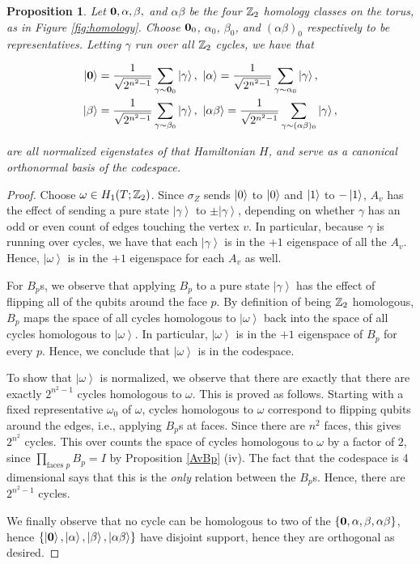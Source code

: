 \documentclass{article}
\newtheorem{proposition}{Proposition}[section]
\theoremstyle{definition}
\numberwithin{figure}{section}
\begin{document}
\begin{proposition}\label{basis} Let $\bold{0},\alpha,\beta,$ and $\alpha\beta$ be the four $\mathbb{Z}_2$ homology classes on the torus, as in Figure \ref{fig:homology}. Choose $\bold{0}_0$, $\alpha_0$, $\beta_0$, and $(\alpha\beta)_0$ respectively to be representatives. Letting $\gamma$ run over all $\mathbb{Z}_2$ cycles, we have that

\begin{align*}
\left|\bold{0}\right> &= \frac{1}{\sqrt{2^{n^2-1}}}\sum_{\gamma\sim \bold{0}_0}\left|\gamma\right>,\,\, \left|\alpha\right>=\frac{1}{\sqrt{2^{n^2-1}}}\sum_{\gamma\sim \alpha_0}\left|\gamma\right>,\\
\left|\beta\right> &= \frac{1}{\sqrt{2^{n^2-1}}}\sum_{\gamma\sim \beta_0}\left|\gamma\right>,\,\, \left|\alpha\beta\right>=\frac{1}{\sqrt{2^{n^2-1}}}\sum_{\gamma\sim (\alpha\beta)_0}\left|\gamma\right>,
\end{align*}

are all normalized eigenstates of that Hamiltonian $H$, and serve as a canonical orthonormal basis of the codespace.
\end{proposition}
\begin{proof} Choose $\omega\in H_1(T;\mathbb{Z}_2)$. Since $\sigma_Z$ sends $\left|0\right>$ to $\left|0\right>$ and $\left|1\right>$ to $-\left|1\right>$, $A_v$ has the effect of sending a pure state $\left|\gamma\right>$ to $\pm\left|\gamma\right>$, depending on whether $\gamma$ has an odd or even count of edges touching the vertex $v$. In particular, because $\gamma$ is running over cycles, we have that each $\left|\gamma\right>$ is in the $+1$ eigenspace of all the $A_v$. Hence, $\left|\omega\right>$ is in the $+1$ eigenspace for each $A_v$ as well.

For $B_p$s, we observe that applying $B_p$ to a pure state $\left|\gamma\right>$ has the effect of flipping all of the qubits around the face $p$. By definition of being $\mathbb{Z}_2$ homologous, $B_p$ maps the space of all cycles homologous to $\left|\omega\right>$ back into the space of all cycles homologous to $\left|\omega\right>$. In particular, $\left|\omega\right>$ is in the $+1$ eigenspace of $B_p$ for every $p$. Hence, we conclude that $\left|\omega\right>$ is in the codespace.

To show that $\left|\omega\right>$ is normalized, we observe that there are exactly that there are exactly $2^{n^2-1}$ cycles homologous to $\omega$. This is proved as follows. Starting with a fixed representative $\omega_0$ of $\omega$, cycles homologous to $\omega$ correspond to flipping qubits around the edges, i.e., applying $B_p$s at faces. Since there are $n^2$ faces, this gives $2^{n^2}$ cycles. This over counts the space of cycles homologous to $\omega$ by a factor of $2$, since $\prod_{\text{faces }p}B_p=I$ by Proposition \ref{AvBp} (iv). The fact that the codespace is 4 dimensional says that this is the \textit{only} relation between the $B_p$s. Hence, there are $2^{n^2-1}$ cycles.

We finally observe that no cycle can be homologous to two of the $\{\bold{0},\alpha,\beta,\alpha\beta\}$, hence $\left\{\left|\bold{0}\right>,\left|\alpha\right>,\left|\beta\right>,\left|\alpha\beta\right>\right\}$ have disjoint support, hence they are orthogonal as desired.
\end{proof}
\end{document}
